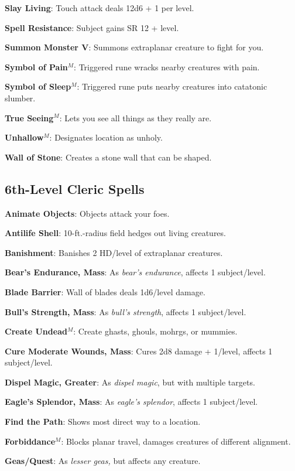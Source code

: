 \textbf{Slay Living}: Touch attack deals 12d6 + 1 per level.

\textbf{Spell Resistance}: Subject gains SR 12 + level.

\textbf{Summon Monster V}: Summons extraplanar creature to fight for you.

\textbf{Symbol of Pain}\(^{M}\): Triggered rune wracks nearby creatures with pain.

\textbf{Symbol of Sleep}\(^{M}\): Triggered rune puts nearby creatures into catatonic slumber.

\textbf{True Seeing}\(^{M}\): Lets you see all things as they really are.

\textbf{Unhallow}\(^{M}\): Designates location as unholy.

\textbf{Wall of Stone}: Creates a stone wall that can be shaped.

\subsection{6th-Level Cleric Spells}


\textbf{Animate Objects}: Objects attack your foes.

\textbf{Antilife Shell}: 10-ft.-radius field hedges out living creatures.

\textbf{Banishment}: Banishes 2 HD/level of extraplanar creatures.

\textbf{Bear's Endurance, Mass}: As \textit{bear's endurance}, affects 1 subject/level.

\textbf{Blade Barrier}: Wall of blades deals 1d6/level damage.

\textbf{Bull's Strength, Mass}: As \textit{bull's strength}, affects 1 subject/level.

\textbf{Create Undead}\(^{M}\): Create ghasts, ghouls, mohrgs, or mummies.

\textbf{Cure Moderate Wounds, Mass}: Cures 2d8 damage + 1/level, affects 1 subject/level.

\textbf{Dispel Magic, Greater}: As \textit{dispel magic}, but with multiple targets.

\textbf{Eagle's Splendor, Mass}: As \textit{eagle's splendor}, affects 1 subject/level.

\textbf{Find the Path}: Shows most direct way to a location.

\textbf{Forbiddance}\(^{M}\): Blocks planar travel, damages creatures of different alignment.

\textbf{Geas/Quest}: As \textit{lesser geas, }but affects any creature.

